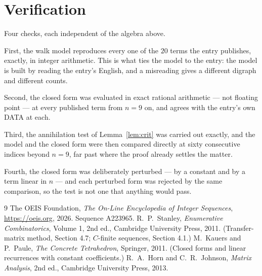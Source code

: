 \documentclass[11pt,a4paper]{article}
\theoremstyle{plain}
\theoremstyle{definition}
\begin{document}
\section{Verification}

Four checks, each independent of the algebra above.

First, the walk model reproduces every one of the $20$ terms the entry publishes,
exactly, in integer arithmetic. This is what ties the model to the entry: the model is built
by reading the entry's English, and a misreading gives a different digraph and different
counts.

Second, the closed form was evaluated in exact rational arithmetic --- not floating point ---
at every published term from $n=9$ on, and agrees with the entry's own DATA at each.

Third, the annihilation test of Lemma~\ref{lem:crit} was carried out exactly, and the model
and the closed form were then compared directly at sixty consecutive indices beyond
$n=9$, far past where the proof already settles the matter.

Fourth, the closed form was deliberately perturbed --- by a constant and by a term linear in
$n$ --- and each perturbed form was rejected by the same comparison, so the test is not one
that anything would pass.

\begin{thebibliography}{9}
 The OEIS Foundation, \emph{The On-Line Encyclopedia of Integer
Sequences}, \url{https://oeis.org}, 2026. Sequence A223965.
 R.~P.~Stanley, \emph{Enumerative Combinatorics}, Volume 1, 2nd ed.,
Cambridge University Press, 2011. (Transfer-matrix method, Section 4.7; $C$-finite sequences,
Section 4.1.)
 M.~Kauers and P.~Paule, \emph{The Concrete Tetrahedron}, Springer, 2011.
(Closed forms and linear recurrences with constant coefficients.)
 R.~A.~Horn and C.~R.~Johnson, \emph{Matrix Analysis}, 2nd ed., Cambridge
University Press, 2013.
\end{thebibliography}
\end{document}

